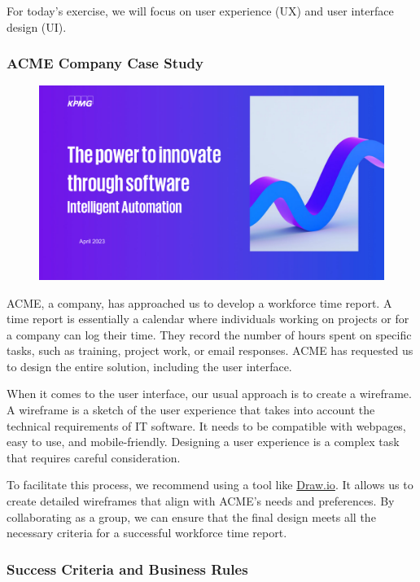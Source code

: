 For today's exercise, we will focus on user experience (UX) and user
interface design (UI).

\subsubsection{ACME Company Case Study}\label{acme-company-case-study}

\begin{figure}[!h]
  \centering
  \includegraphics[page=17, trim = 2cm 2cm 2cm 0cm, clip, width=\imagewidth]{images/02 - KPMG_intelligent_automation_2.pdf}
\end{figure}

ACME, a company, has approached us to develop a workforce time report. A
time report is essentially a calendar where individuals working on
projects or for a company can log their time. They record the number of
hours spent on specific tasks, such as training, project work, or email
responses. ACME has requested us to design the entire solution,
including the user interface.

When it comes to the user interface, our usual approach is to create a
wireframe. A wireframe is a sketch of the user experience that takes
into account the technical requirements of IT software. It needs to be
compatible with webpages, easy to use, and mobile-friendly. Designing a
user experience is a complex task that requires careful consideration.

To facilitate this process, we recommend using a tool like \href{https://www.drawio.com}{Draw.io}. It
allows us to create detailed wireframes that align with ACME's needs and
preferences. By collaborating as a group, we can ensure that the final
design meets all the necessary criteria for a successful workforce time
report.

\subsubsection{Success Criteria and Business
  Rules}\label{success-criteria-and-business-rules}

